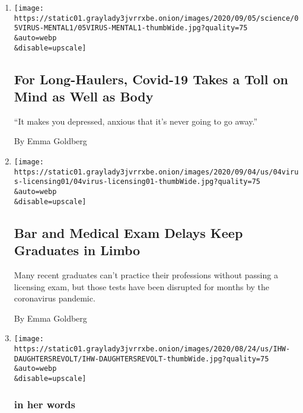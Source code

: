 \begin{enumerate}
\def\labelenumi{\arabic{enumi}.}
\item
  \href{/2020/09/07/health/coronavirus-mental-health-long-hauler.html}{}

  \texttt{[image: https://static01.graylady3jvrrxbe.onion/images/2020/09/05/science/05VIRUS-MENTAL1/05VIRUS-MENTAL1-thumbWide.jpg?quality=75\\\&auto=webp\\\&disable=upscale]}

  \hypertarget{for-long-haulers-covid-19-takes-a-toll-on-mind-as-well-as-body}{%
  \subsection{For Long-Haulers, Covid-19 Takes a Toll on Mind as Well as
  Body}\label{for-long-haulers-covid-19-takes-a-toll-on-mind-as-well-as-body}}

  ``It makes you depressed, anxious that it's never going to go away.''

  By Emma Goldberg
\item
  \href{/2020/09/04/us/bar-exam-coronavirus.html}{}

  \texttt{[image: https://static01.graylady3jvrrxbe.onion/images/2020/09/04/us/04virus-licensing01/04virus-licensing01-thumbWide.jpg?quality=75\\\&auto=webp\\\&disable=upscale]}

  \hypertarget{bar-and-medical-exam-delays-keep-graduates-in-limbo}{%
  \subsection{Bar and Medical Exam Delays Keep Graduates in
  Limbo}\label{bar-and-medical-exam-delays-keep-graduates-in-limbo}}

  Many recent graduates can't practice their professions without passing
  a licensing exam, but those tests have been disrupted for months by
  the coronavirus pandemic.

  By Emma Goldberg
\item
  \href{/2020/08/27/us/family-politics-children-democrat-republican.html}{}

  \texttt{[image: https://static01.graylady3jvrrxbe.onion/images/2020/08/24/us/IHW-DAUGHTERSREVOLT/IHW-DAUGHTERSREVOLT-thumbWide.jpg?quality=75\\\&auto=webp\\\&disable=upscale]}

  \hypertarget{in-her-words}{%
  \subsubsection{in her words}\label{in-her-words}}


\end{enumerate}
